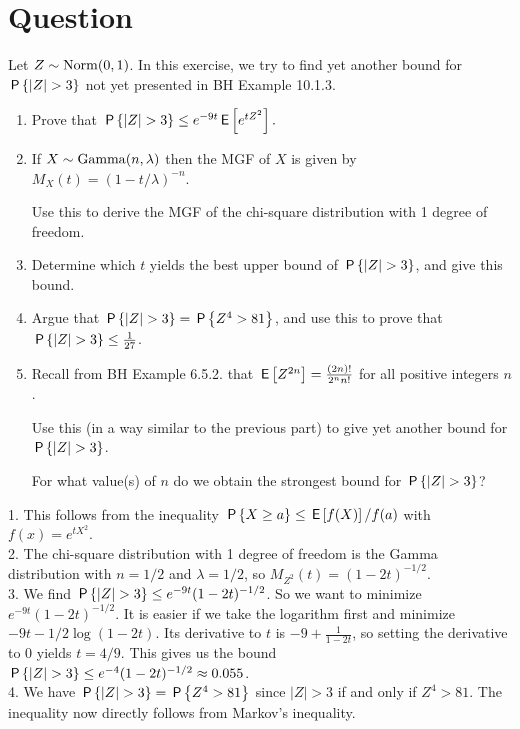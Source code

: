\section{Question}


\begin{exercise}
Let $Z \sim \Norm{0,1}$.
In this exercise, we try to find yet another bound for $\P{|Z| > 3}$ not yet presented in BH Example 10.1.3.
\begin{enumerate}
\item Prove that $\P{|Z| > 3} \leq e^{-9t}\E{e^{t Z^2}}.$
\item If $X \sim \Gamm{n, \lambda}$ then the MGF of $X$ is given by $M_X(t) = (1-t/\lambda)^{-n}$.

Use this to derive the MGF of the chi-square distribution with 1 degree of freedom.
\item Determine which $t$ yields the best upper bound of  $\P{|Z| > 3}$, and give this bound.
\item Argue that $\P{|Z| > 3} = \P{Z^4 > 81}$, and use this to prove that $\P{|Z| > 3} \leq \frac1{27}$.
\item Recall from BH Example 6.5.2. that $\E{Z^{2n}} = \frac{(2n)!}{2^n n!}$ for all positive integers $n$.

Use this (in a way similar to the previous part) to give yet another bound for $\P{|Z| > 3}$.

 For what value(s) of $n$ do we obtain the strongest  bound for   $\P{|Z| > 3}$?
\end{enumerate}
\begin{solution}

1. This follows from the inequality $\P{X \geq a} \leq \E{f(X)}/f(a)$ with $f(x) = e^{tX^2}$. \\

2. The chi-square distribution with 1 degree of freedom is the Gamma distribution with $n = 1/2$ and $\lambda = 1/2$, so $M_{Z^2}(t) = (1-2t)^{-1/2}$. \\

3. We find $\P{|Z| > 3} \leq e^{-9t}(1-2t)^{-1/2}$. So we want to minimize $e^{-9t}(1-2t)^{-1/2}$. It is easier if we take the logarithm first and minimize $-9t -1/2 \log(1-2t)$. Its derivative to $t$ is $-9 + \frac1{1-2t}$, so setting the derivative to 0 yields  $t = 4/9$.
This gives us the bound $\P{|Z| > 3} \leq e^{-4}(1-2t)^{-1/2} \approx 0.055$. \\

4. We have $\P{|Z| > 3} = \P{Z^4 > 81}$ since $|Z| >3$ if and only if $Z^4 > 81$. The inequality now directly follows from Markov's inequality. \\


\end{solution}
\end{exercise}
